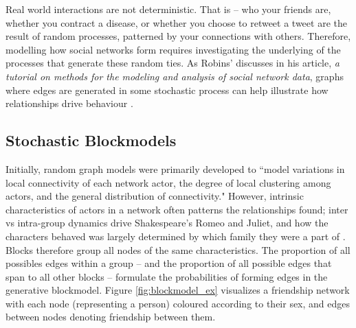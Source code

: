 Real world interactions are not deterministic. That is -- who your friends are,
whether you contract a disease, or whether you choose to retweet a tweet are the
result of random processes, patterned by your connections with others.
Therefore, modelling how social networks form requires investigating the
underlying of the processes that generate these random ties. As Robins'
discusses in his article,\emph{ a tutorial on methods for the modeling and
analysis of social network data}, graphs where edges are generated in some
stochastic process can help illustrate how relationships drive behaviour
\cite{robins2013tutorial}.  

\subsection{Stochastic Blockmodels}\label{sec:SBM}

Initially, random graph models were primarily developed to ``model  variations
in local connectivity of each network actor, the degree of local clustering
among actors, and the general distribution of connectivity."
\cite{robins2013tutorial} However, intrinsic characteristics of actors in a
network often patterns the relationships found; inter vs intra-group dynamics
drive Shakespeare's Romeo and Juliet, and how the characters behaved was largely
determined by which family they were a part of \cite{doreian2005generalized}.
Blocks therefore group all nodes of the same characteristics. The proportion of
all possibles edges within a group -- and the proportion of all possible edges
that span to all other blocks -- formulate the probabilities of forming edges in
the generative blockmodel. Figure \ref{fig:blockmodel_ex} visualizes a
friendship network with each node (representing a person) coloured according to
their sex, and edges between nodes denoting friendship between them.

